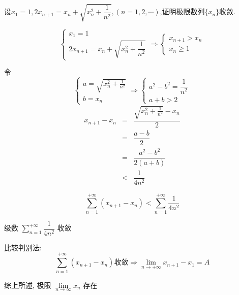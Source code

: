 \begin{proposition}
	设$x_{1}=1,2x_{n+1}=x_{n}+\sqrt{x_{n}^2+\dfrac{1}{n^2}},(n=1,2,\cdots)$,证明极限数列$\{x_{n}\}$收敛.
\end{proposition}
\begin{solution}

	$$\begin{cases}
		x_{1} = 1 \\ 
		2x_{n+1} = x_{n} + \sqrt{x_{n}^{2}+\dfrac{1}{n^{2}}}
	\end{cases}\Rightarrow
	\begin{cases}
		x_{n+1} > x_{n} \\
		x_{n} \geq 1
	\end{cases} $$

	令 $$\begin{cases}
		a = \sqrt{x_{n}^{2}+\frac{1}{n^{2}}}\\
		b = x_{n}
	\end{cases}\Rightarrow
	\begin{cases}
		a^{2} -b^{2} = \dfrac{1}{n^{2}}\\
		a + b > 2
	\end{cases}$$
	\begin{eqnarray*}
		x_{n+1} - x_{n} & = & \dfrac{\sqrt{x_{n}^{2}+\frac{1}{n^{2}}}-x_{n}}{2} \\
						& = & \dfrac{a-b}{2}\\
						& = & \dfrac{a^{2}-b^{2}}{2(a+b)}\\
						& < & \dfrac{1}{4n^{2}}
	\end{eqnarray*}

	$$\sum\limits_{n=1}^{+\infty}(x_{n+1}-x_{n}) < \sum\limits_{n=1}^{+\infty}\dfrac{1}{4n^{2}}$$

	级数 $\sum\limits_{n=1}^{+\infty}\dfrac{1}{4n^{2}}$ 收敛

	比较判别法:
	$$\sum\limits_{n=1}^{+\infty}(x_{n+1}-x_{n})\text{收敛}\Rightarrow \lim\limits_{n\to +\infty}x_{n+1} - x_{1} = A$$
	
	综上所述, 极限 $\lim\limits_{n\to\infty}x_{n}$ 存在
\end{solution}

